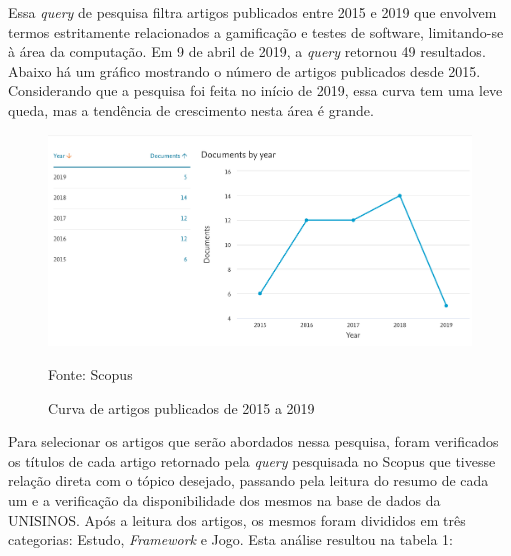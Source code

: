 \documentclass[twoside,english,brazilian]{UNISINOSartigo}
\begin{document}
Essa \textit{query} de pesquisa filtra artigos publicados entre 2015 e 2019 que envolvem termos estritamente relacionados a gamifica\c{c}\~{a}o e testes de software, limitando-se \`{a} \'{a}rea da computa\c{c}\~{a}o. Em 9 de abril de 2019, a \textit{query} retornou 49 resultados. Abaixo h\'{a} um gr\'{a}fico mostrando o n\'{u}mero de artigos publicados desde 2015. Considerando que a pesquisa foi feita no in\'{i}cio de 2019, essa curva tem uma leve queda, mas a tend\^{e}ncia de crescimento nesta \'{a}rea \'{e} grande.


\begin{figure}[!htbp]
	\caption{Curva de artigos publicados de 2015 a 2019}
	\label{fig:imagens/pubByYear.png}
	\centering%
		\includegraphics[width=\textwidth]{imagens/pubByYear.png}
	\begin{center}
        Fonte: Scopus
    \end{center}
\end{figure}

Para selecionar os artigos que ser\~{a}o abordados nessa pesquisa, foram verificados os t\'{i}tulos de cada artigo retornado pela \textit{query} pesquisada no Scopus que tivesse rela\c{c}\~{a}o direta com o t\'{o}pico desejado, passando pela leitura do resumo de cada um e a verifica\c{c}\~{a}o da disponibilidade dos mesmos na base de dados da UNISINOS. Após a leitura dos artigos, os mesmos foram divididos em três categorias: Estudo, \textit{Framework} e Jogo. Esta an\'{a}lise resultou na tabela 1:

\newpage
\end{document}
